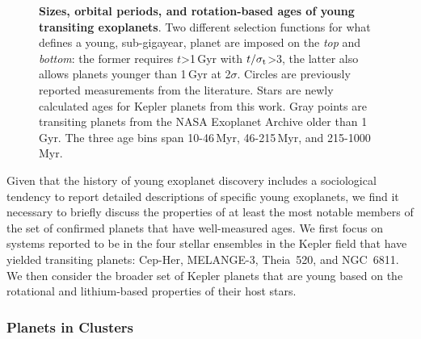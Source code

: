 \documentclass[11pt,twocolumn,tighten]{aastex63}
\begin{document}
\begin{figure}[!t]
	\begin{center}
		
	\end{center}
	\vspace{-0.5cm}
	
	\caption{
		{\bf Sizes, orbital periods, and rotation-based ages of young transiting exoplanets}.
		Two different selection functions for what defines a young, sub-gigayear, planet
		are imposed on the {\it top} and {\it bottom}: the former requires $t$>1\,Gyr with
		$t/\sigma_{\rm t}$>3, the latter also allows planets younger than 1\,Gyr at 2$\sigma$.
		Circles are previously reported measurements from the literature.
		Stars are newly calculated ages for Kepler planets from this work.
		Gray points are transiting planets from the NASA Exoplanet Archive older than
		1\,Gyr.
		The three age bins span 10-46\,Myr, 46-215\,Myr, and 215-1000\,Myr.
		\label{fig:rp_period_age_results}
	}
\end{figure}



Given that the history of young exoplanet discovery includes a
sociological tendency to report detailed descriptions of specific
young exoplanets, we find it necessary to briefly discuss the
properties of at least the most notable members of the set of
confirmed planets that have well-measured ages.
We first focus on systems reported to be in the four stellar
ensembles in the Kepler field that have yielded transiting planets:
Cep-Her, MELANGE-3, Theia~520, and NGC~6811.
We then consider the broader set of Kepler planets that are young
based on the rotational and lithium-based properties of their host
stars.


\subsubsection{Planets in Clusters}
\label{subsec:clusterplanets}
\end{document}
